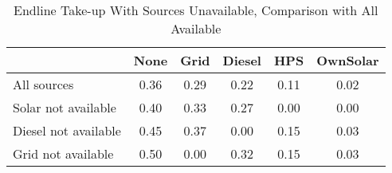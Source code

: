 \begin{table}[htbp]\centering
\caption{Endline Take-up With Sources Unavailable, Comparison with All Available\label {tab1}}
\begin{tabular}{l*{5}{c}}
\toprule
            &        None&        Grid&      Diesel&         HPS&    OwnSolar\\
\midrule
All sources &        0.36&        0.29&        0.22&        0.11&        0.02\\
Solar not available&        0.40&        0.33&        0.27&        0.00&        0.00\\
Diesel not available&        0.45&        0.37&        0.00&        0.15&        0.03\\
Grid not available&        0.50&        0.00&        0.32&        0.15&        0.03\\
\bottomrule
\end{tabular}
\end{table}
